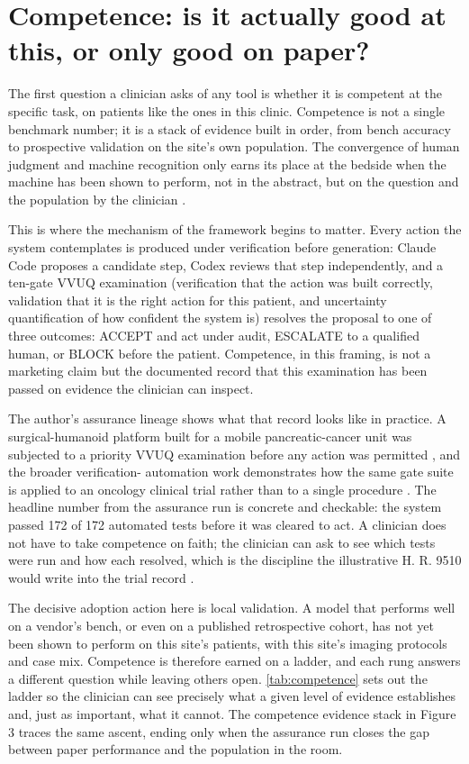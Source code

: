\section{Competence: is it actually good at this, or only good on paper?}
\label{sec:competence}

The first question a clinician asks of any tool is whether it is competent at the
specific task, on patients like the ones in this clinic. Competence is not a single
benchmark number; it is a stack of evidence built in order, from bench accuracy to
prospective validation on the site's own population. The convergence of human
judgment and machine recognition only earns its place at the bedside when
the machine has been shown to perform, not in the abstract, but on the question and
the population by the clinician \cite{topol2019high}.

This is where the mechanism of the framework begins to matter. Every action the
system contemplates is produced under verification before generation: Claude Code
proposes a candidate step, Codex reviews that step independently, and a ten-gate
VVUQ examination (verification that the action was built correctly, validation that
it is the right action for this patient, and uncertainty quantification of how
confident the system is) resolves the proposal to one of three outcomes: ACCEPT
and act under audit, ESCALATE to a qualified human, or BLOCK before the patient.
Competence, in this framing, is not a marketing claim but the documented record
that this examination has been passed on evidence the clinician can inspect.

The author's assurance lineage shows what that record looks like in practice. A
surgical-humanoid platform built for a mobile pancreatic-cancer unit was subjected
to a priority VVUQ examination before any action was permitted
\cite{Kawchak2026MobilePancreaticCancerUnitree}, and the broader verification-
automation work demonstrates how the same gate suite is applied to an oncology
clinical trial rather than to a single procedure
\cite{Kawchak2026VVUQOncologyClinicalTrial}. The headline number from the assurance
run is concrete and checkable: the system passed 172 of 172 automated tests before
it was cleared to act. A clinician does not have to take competence on faith; the
clinician can ask to see which tests were run and how each resolved, which is the
discipline the illustrative H. R. 9510 would write into the trial record
\cite{Kawchak2026HR9510Bill}.

The decisive adoption action here is local validation. A model that performs well
on a vendor's bench, or even on a published retrospective cohort, has not yet been
shown to perform on this site's patients, with this site's imaging protocols and
case mix. Competence is therefore earned on a ladder, and each rung answers a
different question while leaving others open. \autoref{tab:competence} sets out the
ladder so the clinician can see precisely what a given level of evidence
establishes and, just as important, what it cannot. The competence evidence stack
in Figure 3 traces the same ascent, ending only when the assurance run closes the
gap between paper performance and the population in the room.

